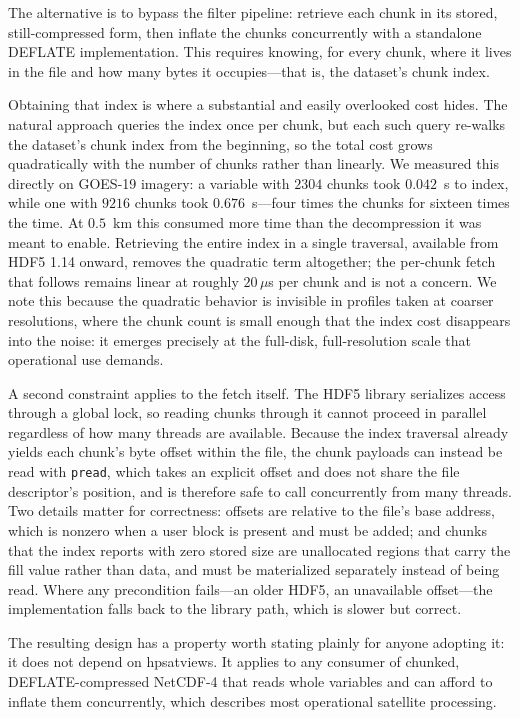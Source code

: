 \documentclass[11pt]{article}
\begin{document}
The alternative is to bypass the filter pipeline: retrieve each chunk in its
stored, still-compressed form, then inflate the chunks concurrently with a
standalone DEFLATE implementation. This requires knowing, for every chunk,
where it lives in the file and how many bytes it occupies---that is, the
dataset's chunk index.

Obtaining that index is where a substantial and easily overlooked cost hides.
The natural approach queries the index once per chunk, but each such query
re-walks the dataset's chunk index from the beginning, so the total cost grows
quadratically with the number of chunks rather than linearly. We measured this
directly on GOES-19 imagery: a variable with $2304$ chunks took $0.042$~s to
index, while one with $9216$ chunks took $0.676$~s---four times the chunks for
sixteen times the time. At $0.5$~km this consumed more time than the
decompression it was meant to enable. Retrieving the entire index in a single
traversal, available from HDF5 1.14 onward, removes the quadratic term
altogether; the per-chunk fetch that follows remains linear at roughly
$20\,\mu$s per chunk and is not a concern. We note this because the quadratic
behavior is invisible in profiles taken at coarser resolutions, where the chunk
count is small enough that the index cost disappears into the noise: it emerges
precisely at the full-disk, full-resolution scale that operational use demands.

A second constraint applies to the fetch itself. The HDF5 library serializes
access through a global lock, so reading chunks through it cannot proceed in
parallel regardless of how many threads are available. Because the index
traversal already yields each chunk's byte offset within the file, the chunk
payloads can instead be read with \texttt{pread}, which takes an explicit
offset and does not share the file descriptor's position, and is therefore safe
to call concurrently from many threads. Two details matter for correctness:
offsets are relative to the file's base address, which is nonzero when a user
block is present and must be added; and chunks that the index reports with zero
stored size are unallocated regions that carry the fill value rather than data,
and must be materialized separately instead of being read. Where any
precondition fails---an older HDF5, an unavailable offset---the implementation
falls back to the library path, which is slower but correct.

The resulting design has a property worth stating plainly for anyone adopting
it: it does not depend on hpsatviews. It applies to any consumer of chunked,
DEFLATE-compressed NetCDF-4 that reads whole variables and can afford to
inflate them concurrently, which describes most operational satellite
processing.
\end{document}
